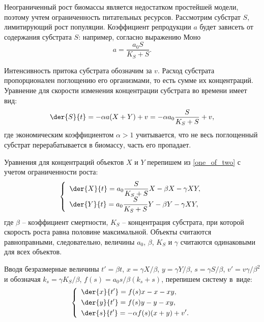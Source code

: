 Неограниченный рост биомассы является недостатком простейшей модели, поэтому
учтем ограниченность питательных ресурсов. Рассмотрим субстрат \( S \),
лимитирующий рост популяции. Коэффициент репродукции \( a \) будет зависеть от
содержания субстрата \( S \): например, согласно выражению Моно
\begin{equation}
    a = \frac{a_0 S}{K_S + S}.
    \label{Mono}
\end{equation}

Интенсивность притока субстрата обозначим за \( v \). Расход субстрата
пропорционален поглощению его организмами, то есть сумме их концентраций.
Уравнение для скорости изменения концентрации субстрата во времени имеет вид:
\[
    \der{S}{t} = -\alpha a(X + Y) + v = -\alpha a_0 \frac{S}{K_S + S} + v,
\]
где экономическим коэффициентом \( \alpha > 1 \) учитывается, что не весь
поглощенный субстрат перерабатывается в биомассу, часть его пропадает.

Уравнения для концентраций объектов \( X \) и \( Y \) перепишем из
\eqref{one_of_two} с учетом ограниченности роста:
\begin{equation}
    \left\{ \begin{array}{l}
        \ds \der{X}{t} = a_0\frac{S}{K_S + S}X - \beta X - \gamma XY, \\[.3em]
        \ds \der{Y}{t} = a_0\frac{S}{K_S + S}Y - \beta Y - \gamma XY,
    \end{array} \right.
    \label{one_of_two_lim}
\end{equation}
где \( \beta \) -- коэффициент смертности, \( K_S \) -- концентрация субстрата,
при которой скорость роста равна половине максимальной. Объекты считаются
равноправными, следовательно, величины \( a_0 \), \( \beta \), \( K_S \) и
\( \gamma \) считаются одинаковыми для всех объектов.

Вводя безразмерные величины \( t' = \beta t \), \( x = \gamma X/\beta \),
\( y = \gamma Y/\beta \), \( s = \gamma S/\beta \), \( v' = v\gamma/\beta^2 \)
и обозначая \( k_s = \gamma K_S/\beta \), \( f(s) = a_0s/\beta(k_s + s) \),
перепишем систему в~виде:
\begin{equation}
    \left\{ \begin{array}{l}
        \ds \der{x}{t'} = f(s)x - x - xy, \\[.3em]
        \ds \der{y}{t'} = f(s)y - y - xy, \\[.3em]
        \ds \der{s}{t'} = -\alpha f(s)(x + y) + v'.
    \end{array} \right.
    \label{one_of_two_lim_ml}
\end{equation}

